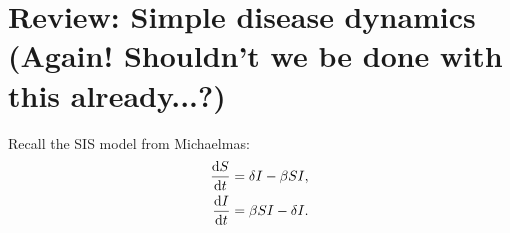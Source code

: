 \documentclass[a4paper,12pt]{article}
\begin{document}
 
%
\newcommand{\sol}[1]{}

\section{Review: Simple disease dynamics (Again! Shouldn't we be done with this already...?)}
    Recall the SIS model from Michaelmas:
    \begin{align*}
        \fd{S}{t} &= \delta I - \beta SI,\\
        \fd{I}{t} &= \beta SI-\delta I.
    \end{align*}
\end{document}
